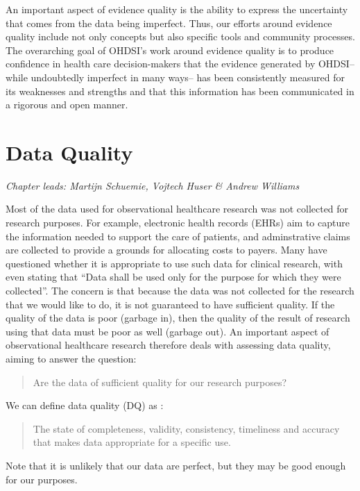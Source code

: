 \documentclass[11pt]{book}
\theoremstyle{definition}
\theoremstyle{definition}
\theoremstyle{definition}
\theoremstyle{remark}
\begin{document}
An important aspect of evidence quality is the ability to express the uncertainty that comes from the data being imperfect. Thus, our efforts around evidence quality include not only concepts but also specific tools and community processes. The overarching goal of OHDSI's work around evidence quality is to produce confidence in health care decision-makers that the evidence generated by OHDSI-- while undoubtedly imperfect in many ways-- has been consistently measured for its weaknesses and strengths and that this information has been communicated in a rigorous and open manner.

\hypertarget{DataQuality}{%
\chapter{Data Quality}\label{DataQuality}}

\emph{Chapter leads: Martijn Schuemie, Vojtech Huser \& Andrew Williams}

Most of the data used for observational healthcare research was not collected for research purposes. For example, electronic health records (EHRs) aim to capture the information needed to support the care of patients, and adminstrative claims are collected to provide a grounds for allocating costs to payers. Many have questioned whether it is appropriate to use such data for clinical research, with \citet{vanDerLei_1991} even stating that ``Data shall be used only for the purpose for which they were collected''. The concern is that because the data was not collected for the research that we would like to do, it is not guaranteed to have sufficient quality. If the quality of the data is poor (garbage in), then the quality of the result of research using that data must be poor as well (garbage out). An important aspect of observational healthcare research therefore deals with assessing data quality, aiming to answer the question:

\begin{quote}
Are the data of sufficient quality for our research purposes?
\end{quote}

We can define data quality (DQ) as \citep{roebuck_2012}: 

\begin{quote}
The state of completeness, validity, consistency, timeliness and accuracy that makes data appropriate for a specific use.
\end{quote}

Note that it is unlikely that our data are perfect, but they may be good enough for our purposes.
\end{document}
